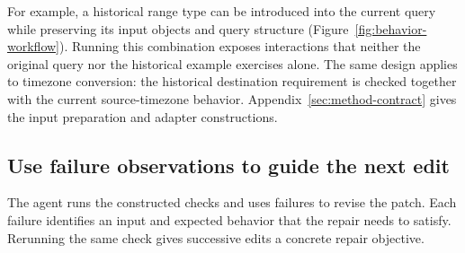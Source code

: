 For example, a historical range type can be introduced into the current
query while preserving its input objects and query structure
(Figure~\ref{fig:behavior-workflow}). Running this combination exposes interactions
that neither the original query nor the historical example exercises alone.
The same design applies to timezone conversion: the historical destination
requirement is checked together with the current source-timezone behavior.
Appendix~\ref{sec:method-contract} gives the input preparation and adapter
constructions.

\subsection{Use failure observations to guide the next edit}\label{sec:feedback}
The agent runs the constructed checks and uses failures to revise the patch.
Each failure identifies an input and expected behavior that the repair needs
to satisfy. Rerunning the same check gives successive edits a concrete
repair objective.
